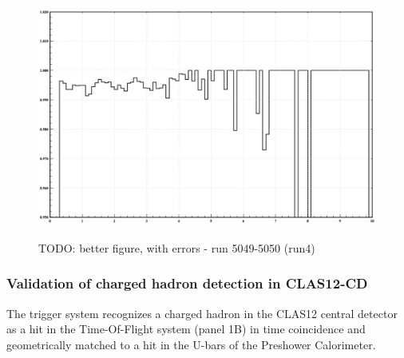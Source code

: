 \begin{figure}[!htb]
 \centering
{\includegraphics[width=.5\textwidth]{img/FD_TrackEfficiency.png}}
 \caption{TODO: better figure, with errors - run 5049-5050 (run4)}
 \label{fig:FD_TrackEfficiency}
\end{figure}



\subsubsection{Validation of charged hadron detection in CLAS12-CD}

The trigger system recognizes a charged hadron in the CLAS12 central detector as a hit in the Time-Of-Flight system (panel 1B) in time coincidence and geometrically matched to a hit in the U-bars of the Preshower Calorimeter.

